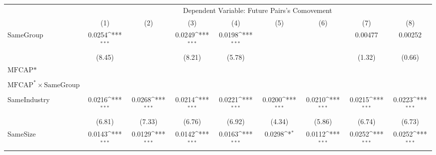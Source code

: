 {
\def\sym#1{\ifmmode^{#1}\else\(^{#1}\)\fi}
\begin{tabular}{l*{8}{c}}
\hline\hline
                &\multicolumn{8}{c}{Dependent Variable:  Future Pairs's Comovement}                                                                                     \\\cmidrule(lr){2-9}
                &\multicolumn{1}{c}{(1)}         &\multicolumn{1}{c}{(2)}         &\multicolumn{1}{c}{(3)}         &\multicolumn{1}{c}{(4)}         &\multicolumn{1}{c}{(5)}         &\multicolumn{1}{c}{(6)}         &\multicolumn{1}{c}{(7)}         &\multicolumn{1}{c}{(8)}         \\
\hline
SameGroup       &   0.0254\sym{***}&                  &   0.0249\sym{***}&   0.0198\sym{***}&                  &                  &  0.00477         &  0.00252         \\
                &   (8.45)         &                  &   (8.21)         &   (5.78)         &                  &                  &   (1.32)         &   (0.66)         \\
[1em]
$ \text{MFCAP*} $&                  &                  &                  &                  &                  &                  &                  &                  \\
                &                  &                  &                  &                  &                  &                  &                  &                  \\
[1em]
 $ \text{MFCAP}^* \times {\text{SameGroup} }  $ &                  &                  &                  &                  &                  &                  &                  &                  \\
                &                  &                  &                  &                  &                  &                  &                  &                  \\
[1em]
SameIndustry    &   0.0216\sym{***}&   0.0268\sym{***}&   0.0214\sym{***}&   0.0221\sym{***}&   0.0200\sym{***}&   0.0210\sym{***}&   0.0215\sym{***}&   0.0223\sym{***}\\
                &   (6.81)         &   (7.33)         &   (6.76)         &   (6.92)         &   (4.34)         &   (5.86)         &   (6.74)         &   (6.73)         \\
[1em]
SameSize        &   0.0143\sym{***}&   0.0129\sym{***}&   0.0142\sym{***}&   0.0163\sym{***}&   0.0298\sym{*}  &   0.0112\sym{***}&   0.0252\sym{***}&   0.0252\sym{***}\\

\end{tabular}}
